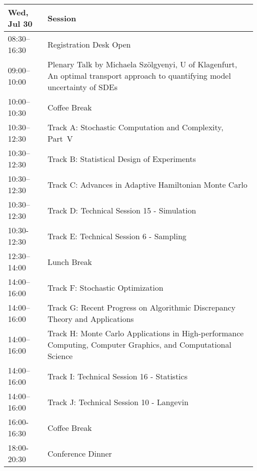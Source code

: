 \begin{table}
{\footnotesize
\begin{tabularx}{\textwidth}{>{\hsize=0.32\hsize}X|>{\hsize=1.7\hsize}X}
\hline
\textbf{Wed, Jul 30} & \textbf{Session} \\
\hline
\cellcolor{\EmptyColor}08:30–16:30 & \cellcolor{\EmptyColor}Registration Desk Open \\
\cellcolor{\PlenaryColor}09:00–10:00 & \cellcolor{\PlenaryColor}Plenary Talk by Michaela Szölgyenyi, U of Klagenfurt, An optimal transport approach to quantifying model uncertainty of SDEs \\
\cellcolor{\EmptyColor}10:00–10:30 & \cellcolor{\EmptyColor}Coffee Break \\
\cellcolor{\SessionTitleColor}10:30–12:30 & \cellcolor{\SessionTitleColor}Track A: Stochastic Computation and Complexity, Part~V \\
\cellcolor{\SessionTitleColor}10:30–12:30 & \cellcolor{\SessionTitleColor}Track B: Statistical Design of Experiments \\
\cellcolor{\SessionTitleColor}10:30–12:30 & \cellcolor{\SessionTitleColor}Track C: Advances in Adaptive Hamiltonian Monte Carlo \\
\cellcolor{\SessionLightColor}10:30–12:30 & \cellcolor{\SessionLightColor}Track D: Technical Session 15 - Simulation \\
\cellcolor{\SessionLightColor}10:30-12:30 & \cellcolor{\SessionLightColor}Track E: Technical Session 6 - Sampling \\
\cellcolor{\EmptyColor}12:30–14:00 & \cellcolor{\EmptyColor}Lunch Break \\
\cellcolor{\SessionTitleColor}14:00–16:00 & \cellcolor{\SessionTitleColor}Track F: Stochastic Optimization \\
\cellcolor{\SessionTitleColor}14:00–16:00 & \cellcolor{\SessionTitleColor}Track G: Recent Progress on Algorithmic Discrepancy Theory and Applications \\
\cellcolor{\SessionTitleColor}14:00–16:00 & \cellcolor{\SessionTitleColor}Track H: Monte Carlo Applications in High-performance Computing, Computer Graphics, and Computational Science \\
\cellcolor{\SessionLightColor}14:00–16:00 & \cellcolor{\SessionLightColor}Track I: Technical Session 16 - Statistics \\
\cellcolor{\SessionLightColor}14:00–16:00 & \cellcolor{\SessionLightColor}Track J: Technical Session 10 - Langevin \\
\cellcolor{\EmptyColor}16:00-16:30 & \cellcolor{\EmptyColor}Coffee Break \\
\cellcolor{\EmptyColor}18:00-20:30 & \cellcolor{\EmptyColor}Conference Dinner \\
\hline
\end{tabularx}
}
\end{table}

